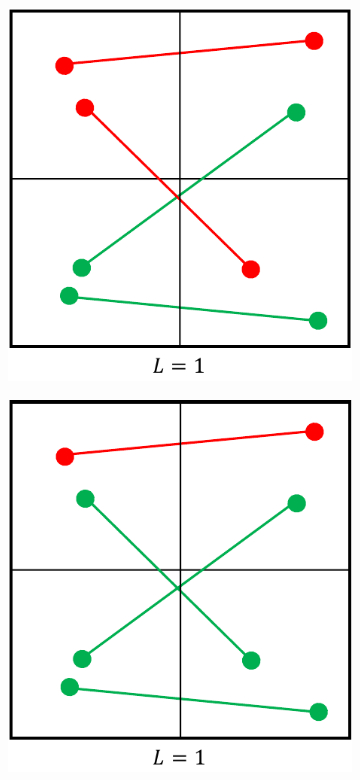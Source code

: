 \documentclass[bachelor,       %
               oneside,        %
               BCOR10mm,       %
               ngerman, english %
               ]{GAUBM}
\begin{document}
\begin{figure}[H]
  \centering
  \begin{subfigure}[b]{0.25\textwidth}
      \centering
      \includegraphics[width=\textwidth]{figures/loss-1.pdf}
      \caption{}
      \label{fig:loss-1}
  \end{subfigure}
    \hfill
  \begin{subfigure}[b]{0.25\textwidth}
      \centering
      \includegraphics[width=\textwidth]{figures/loss-2.pdf}

\end{subfigure}
\end{figure}
\end{document}
